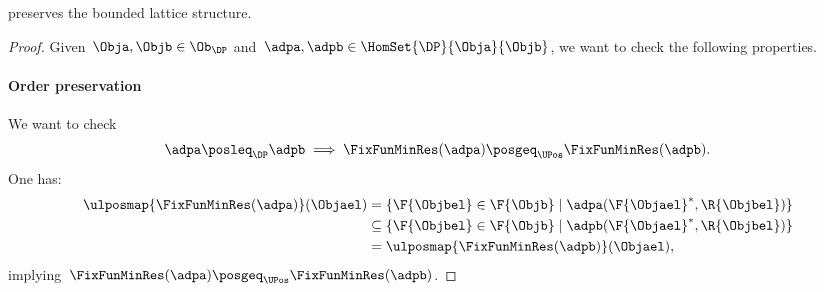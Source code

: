 
\begin{lemma}
    \FixFunMinRes preserves the bounded lattice structure.
\end{lemma}
\begin{proof}
    Given~$\Obja,\Objb \in \Ob_\DP$ and~$\adpa,\adpb \in \HomSet{\DP}{\Obja}{\Objb}$, we want to check the following properties.
    \paragraph*{Order preservation}
    We want to check
    \begin{equation*}
        \adpa \posleq_\DP \adpb \implies \FixFunMinRes(\adpa) \posgeq_\UPos \FixFunMinRes(\adpb).
    \end{equation*}
    One has:
    \begin{equation*}
        \begin{aligned}
        \ulposmap{\FixFunMinRes(\adpa)}(\Objael)&=\{\F{\Objbel} \in \F{\Objb} \mid \adpa(\F{\Objael}^*, \R{\Objbel})\}\\
            &\subseteq \{\F{\Objbel} \in \F{\Objb} \mid \adpb(\F{\Objael}^*, \R{\Objbel})\}\\
            &= \ulposmap{\FixFunMinRes(\adpb)}(\Objael),
        \end{aligned}
    \end{equation*}
    implying~$\FixFunMinRes(\adpa) \posgeq_\UPos \FixFunMinRes(\adpb)$.

\end{proof}

